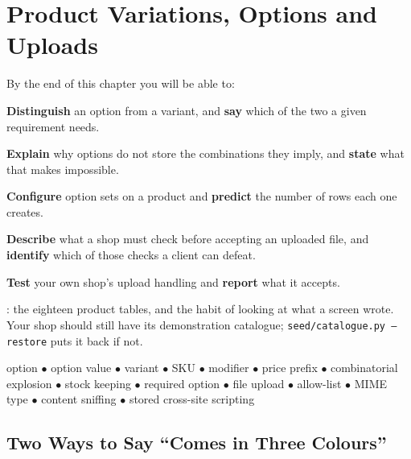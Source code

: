 \chapter{Product Variations, Options and Uploads}\label{ch:variations}

\begin{outcomes}
By the end of this chapter you will be able to:
\begin{tight}
  \item \textbf{Distinguish} an option from a variant, and \textbf{say} which
        of the two a given requirement needs.
  \item \textbf{Explain} why options do not store the combinations they imply,
        and \textbf{state} what that makes impossible.
  \item \textbf{Configure} option sets on a product and \textbf{predict} the
        number of rows each one creates.
  \item \textbf{Describe} what a shop must check before accepting an uploaded
        file, and \textbf{identify} which of those checks a client can defeat.
  \item \textbf{Test} your own shop's upload handling and \textbf{report} what
        it accepts.
\end{tight}
\end{outcomes}

\begin{prereq}
: the eighteen product tables, and the habit of looking at
what a screen wrote. Your shop should still have its demonstration catalogue;
\texttt{seed/catalogue.py --restore} puts it back if not.
\end{prereq}

\begin{keyterms}
option $\bullet$ option value $\bullet$ variant $\bullet$ SKU $\bullet$
modifier $\bullet$ price prefix $\bullet$ combinatorial explosion $\bullet$
stock keeping $\bullet$ required option $\bullet$ file upload $\bullet$
allow-list $\bullet$ MIME type $\bullet$ content sniffing $\bullet$ stored
cross-site scripting
\end{keyterms}

\section{Two Ways to Say ``Comes in Three Colours''}

